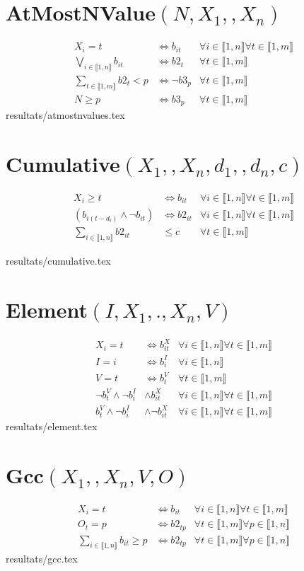 \documentclass{article}
\newcommand{\cumul}{Cumulative$(\{X_1,\ldots,X_n\},\{d_1,\ldots,d_n\},c)~$}
\newcommand{\atmnvalue}{AtMostNValue$(N,\{X_1,\ldots,X_n\})~$}
\newcommand{\gcc}{Gcc$(\{X_1,\ldots,X_n\},V,O)~$}
\newcommand{\element}{Element$(I,\{X_1,.\ldots,X_n\},V)~$}
\newcommand{\I}{i\in\llbracket1,n\rrbracket}
\newcommand{\T}{t\in\llbracket1,m\rrbracket}
\newcommand{\PP}{p\in\llbracket1,n\rrbracket}
\newcommand{\fai}{\forall\I}
\newcommand{\fat}{\forall\T}
\newcommand{\fap}{\forall\PP}
\newcommand{\fit}{\fai\fat}
\def\{{}%
\def\}{}%
\def\ldots{}%
\begin{document}
\section{\texorpdfstring{\atmnvalue}{atmnvalue}}
\begin{align*}
    X_i=t &\iff b_{it}&\fit\\
    \bigvee_{\I}b_{it}&\iff b2_t&\fat\\
    \sum_{\T}b2_{t} < p&\iff \neg b3_{p}&\fat\\
    N\geq p &\iff b3_p&\fat
\end{align*}
{resultats/atmostnvalues.tex}

\section{\texorpdfstring{\cumul}{cumul}}
\begin{align*}
    X_i \geq t & \iff b_{it}&\fit\\
    (b_{i(t-d_i)} \wedge \neg b_{it}) & \iff b2_{it}&\fit\\
    \sum_{\I} b2_{it} & \leq c & \fat
\end{align*}
\begin{tiny}
{resultats/cumulative.tex}
\end{tiny}

\section{\texorpdfstring{\element}{element}}
\begin{align*}
    X_i=t &\iff b_{it}^X&\fit\\
    I=i &\iff b_i^I&\fai\\
    V=t &\iff b_t^V&\fat\\
    \neg b_t^V\wedge \neg b_i^I & \wedge b_{it}^X &\fit\\
    b_t^V\wedge \neg b_i^I & \wedge \neg b_{it}^X &\fit
\end{align*}
{resultats/element.tex}

\section{\texorpdfstring{\gcc}{gcc}}
\begin{align*}
    X_i=t &\iff b_{it}&\fit\\
    O_t=p &\iff b2_{tp}&\fat\fap\\
    \sum_{\I}b_{it} \geq p&\iff b2_{tp}&\fat\fap
\end{align*}
{resultats/gcc.tex}
\end{document}
